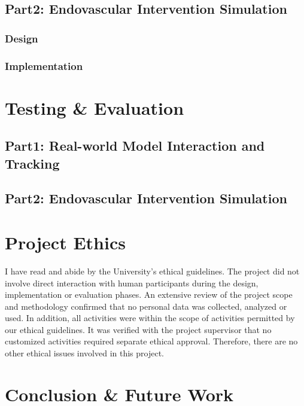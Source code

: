 \documentclass[12pt]{article}
\begin{document}
\subsection{Part2: Endovascular Intervention Simulation}

\subsubsection{Design}

\subsubsection{Implementation}


\section{Testing \& Evaluation}
\subsection{Part1: Real-world Model Interaction and Tracking}

\subsection{Part2: Endovascular Intervention Simulation}

\section{Project Ethics}
I have read and abide by the University’s ethical guidelines\cite{UoL_COMP390_2023-24}. The project did not involve direct interaction with human
participants during the design, implementation or evaluation phases. An extensive review of the project scope and methodology
confirmed that no personal data was collected, analyzed or used. In addition, all activities were within the scope of activities
permitted by our ethical guidelines. It was verified with the project supervisor that no customized activities required separate
ethical approval. Therefore, there are no other ethical issues involved in this project.
\section{Conclusion \& Future Work}
\end{document}
